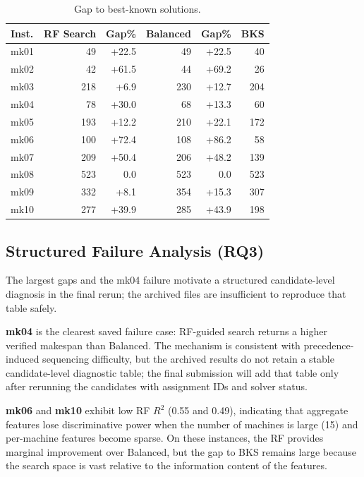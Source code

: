 \documentclass[12pt]{article}
\begin{document}
\begin{table}[htbp]\centering\caption{Gap to best-known solutions.}\label{tab:bks}
\begin{tabular}{lrrrrr}\toprule
Inst. & RF Search & Gap\% & Balanced & Gap\% & BKS \\ \midrule
mk01 & 49 & +22.5 & 49 & +22.5 & 40 \\
mk02 & 42 & +61.5 & 44 & +69.2 & 26 \\
mk03 & 218 & +6.9 & 230 & +12.7 & 204 \\
mk04 & 78 & +30.0 & 68 & +13.3 & 60 \\
mk05 & 193 & +12.2 & 210 & +22.1 & 172 \\
mk06 & 100 & +72.4 & 108 & +86.2 & 58 \\
mk07 & 209 & +50.4 & 206 & +48.2 & 139 \\
mk08 & 523 & 0.0 & 523 & 0.0 & 523 \\
mk09 & 332 & +8.1 & 354 & +15.3 & 307 \\
mk10 & 277 & +39.9 & 285 & +43.9 & 198 \\ \bottomrule
\end{tabular}
\end{table}

\subsection{Structured Failure Analysis (RQ3)}

The largest gaps and the mk04 failure motivate a structured candidate-level diagnosis in the final rerun; the archived files are insufficient to reproduce that table safely.

\textbf{mk04} is the clearest saved failure case: RF-guided search returns a higher verified makespan than Balanced. The mechanism is consistent with precedence-induced sequencing difficulty, but the archived results do not retain a stable candidate-level diagnostic table; the final submission will add that table only after rerunning the candidates with assignment IDs and solver status.

\textbf{mk06} and \textbf{mk10} exhibit low RF $R^2$ (0.55 and 0.49), indicating that aggregate features lose discriminative power when the number of machines is large (15) and per-machine features become sparse. On these instances, the RF provides marginal improvement over Balanced, but the gap to BKS remains large because the search space is vast relative to the information content of the features.
\end{document}
